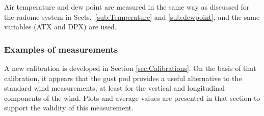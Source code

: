 \documentclass[12pt,twoside,english]{article}\usepackage[]{graphicx}\usepackage[]{color}
\let\OrgIndex\index
\renewcommand*{\index}[1]{\OrgIndex{#1}}
\begin{document}
Air temperature and dew point are measured in the same way as discussed for the radome system in Sects.~\ref{sub:Temperature} and \ref{sub:dewpoint}, and the same variables (ATX and DPX) are used. 


\subsubsection{Examples of measurements}

A new calibration is developed in Section \ref{sec:Calibrations}. On the basis of that calibration, it appears that the gust pod provides a useful alternative to the standard wind measurements, at least for the vertical and longitudinal components of the wind. Plots and average values are presented in that section to support the validity of this measurement. 


\end{document}
